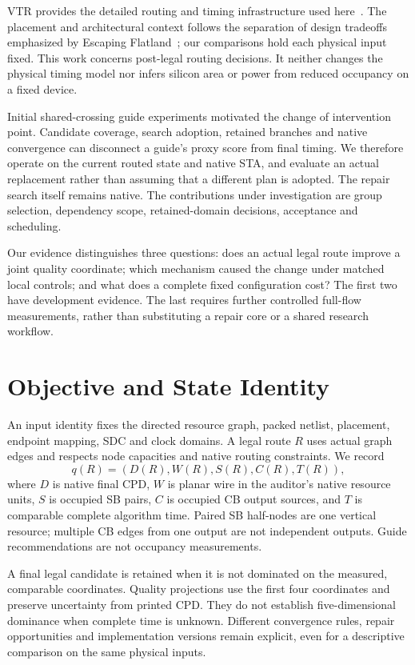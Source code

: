 \documentclass[conference,10pt]{IEEEtran}
\begin{document}
VTR provides the detailed routing and timing infrastructure used here~\cite{vtr9paper}. The placement and architectural context follows the separation of design tradeoffs emphasized by Escaping Flatland~\cite{flatland}; our comparisons hold each physical input fixed. This work concerns post-legal routing decisions. It neither changes the physical timing model nor infers silicon area or power from reduced occupancy on a fixed device.

Initial shared-crossing guide experiments motivated the change of intervention point. Candidate coverage, search adoption, retained branches and native convergence can disconnect a guide's proxy score from final timing. We therefore operate on the current routed state and native STA, and evaluate an actual replacement rather than assuming that a different plan is adopted. The repair search itself remains native. The contributions under investigation are group selection, dependency scope, retained-domain decisions, acceptance and scheduling.

Our evidence distinguishes three questions: does an actual legal route improve a joint quality coordinate; which mechanism caused the change under matched local controls; and what does a complete fixed configuration cost? The first two have development evidence. The last requires further controlled full-flow measurements, rather than substituting a repair core or a shared research workflow.

\section{Objective and State Identity}
An input identity fixes the directed resource graph, packed netlist, placement, endpoint mapping, SDC and clock domains. A legal route $R$ uses actual graph edges and respects node capacities and native routing constraints. We record
\begin{equation}
 q(R)=(D(R),W(R),S(R),C(R),T(R)),
\end{equation}
where $D$ is native final CPD, $W$ is planar wire in the auditor's native resource units, $S$ is occupied SB pairs, $C$ is occupied CB output sources, and $T$ is comparable complete algorithm time. Paired SB half-nodes are one vertical resource; multiple CB edges from one output are not independent outputs. Guide recommendations are not occupancy measurements.

A final legal candidate is retained when it is not dominated on the measured, comparable coordinates. Quality projections use the first four coordinates and preserve uncertainty from printed CPD. They do not establish five-dimensional dominance when complete time is unknown. Different convergence rules, repair opportunities and implementation versions remain explicit, even for a descriptive comparison on the same physical inputs.
\end{document}
